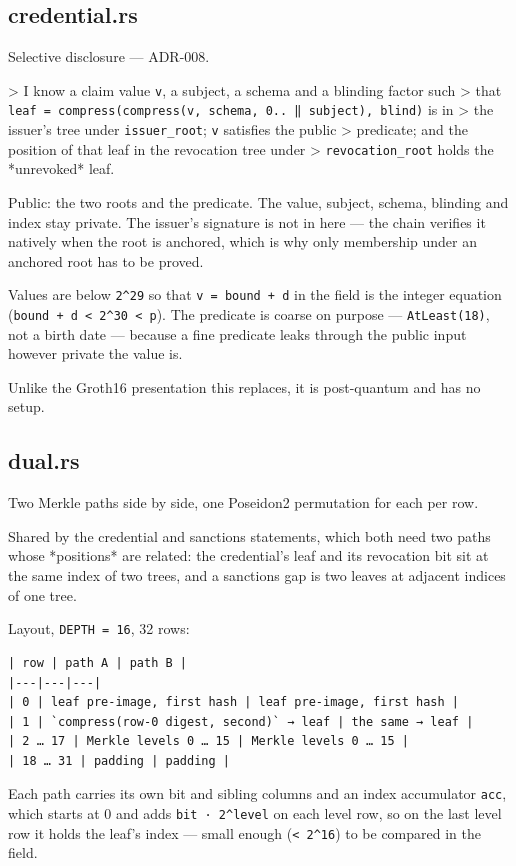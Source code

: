 \documentclass[11pt,a4paper]{article}
\begin{document}
\subsection{credential.rs}
Selective disclosure — ADR-008.

> I know a claim value \texttt{v}, a subject, a schema and a blinding factor such
> that \texttt{leaf = compress(compress(v, schema, 0.. ‖ subject), blind)} is in
> the issuer's tree under \texttt{issuer\_root}; \texttt{v} satisfies the public
> predicate; and the position of that leaf in the revocation tree under
> \texttt{revocation\_root} holds the *unrevoked* leaf.

Public: the two roots and the predicate. The value, subject, schema,
blinding and index stay private. The issuer's signature is not in here —
the chain verifies it natively when the root is anchored, which is why
only membership under an anchored root has to be proved.

Values are below \texttt{2\textasciicircum{}29} so that \texttt{v = bound + d} in the field is the
integer equation (\texttt{bound + d < 2\textasciicircum{}30 < p}). The predicate is coarse on
purpose — \texttt{AtLeast(18)}, not a birth date — because a fine predicate
leaks through the public input however private the value is.

Unlike the Groth16 presentation this replaces, it is post-quantum and has
no setup.

\subsection{dual.rs}
Two Merkle paths side by side, one Poseidon2 permutation for each per row.

Shared by the credential and sanctions statements, which both need two
paths whose *positions* are related: the credential's leaf and its
revocation bit sit at the same index of two trees, and a sanctions gap is
two leaves at adjacent indices of one tree.

Layout, \texttt{DEPTH = 16}, 32 rows:

\begin{verbatim}
| row | path A | path B |
|---|---|---|
| 0 | leaf pre-image, first hash | leaf pre-image, first hash |
| 1 | `compress(row-0 digest, second)` → leaf | the same → leaf |
| 2 … 17 | Merkle levels 0 … 15 | Merkle levels 0 … 15 |
| 18 … 31 | padding | padding |
\end{verbatim}

Each path carries its own bit and sibling columns and an index accumulator
\texttt{acc}, which starts at 0 and adds \texttt{bit · 2\textasciicircum{}level} on each level row, so on
the last level row it holds the leaf's index — small enough (\texttt{< 2\textasciicircum{}16}) to
be compared in the field.
\end{document}
